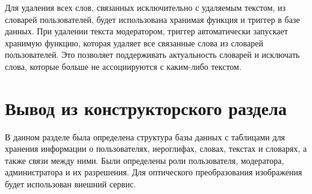 Для удаления всех слов, связанных исключительно с удаляемым текстом, из словарей пользователей, будет использована хранимая функция и триггер в базе данных. При удалении текста модератором, триггер автоматически запускает хранимую функцию, которая удаляет все связанные слова из словарей пользователей. Это позволяет поддерживать актуальность словарей и исключать слова, которые больше не ассоциируются с каким-либо текстом.

\section*{Вывод из конструкторского раздела}

В данном разделе была определена структура базы данных с таблицами для хранения информации о пользователях, иероглифах, словах, текстах и словарях, а также связи между ними. Были определены роли пользователя, модератора, администратора и их разрешения. Для оптического преобразования изображения будет использован внешний сервис.
